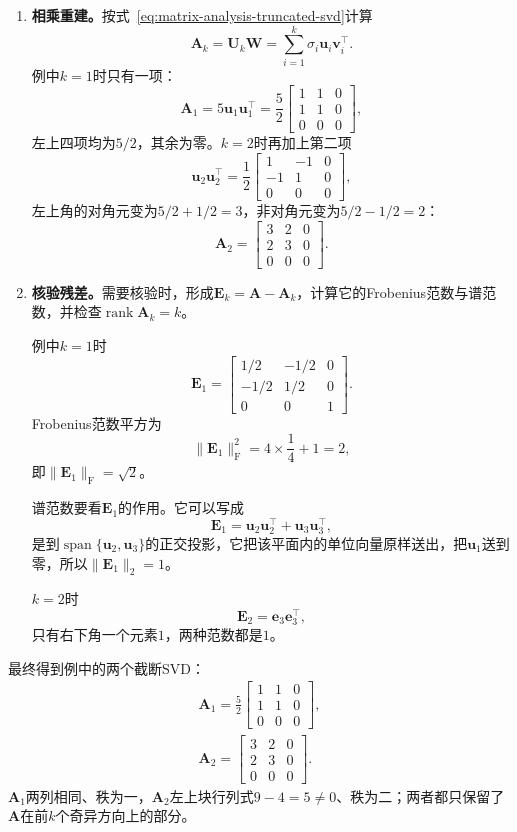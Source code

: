 \begin{enumerate}
 \item \textbf{相乘重建。}按式~\eqref{eq:matrix-analysis-truncated-svd}计算
 \[
  \bm A_k=\bm U_k\bm W=\sum_{i=1}^k\sigma_i\bm u_i\bm v_i^\top .
 \]
 例中$k=1$时只有一项：
 \[
  \bm A_1=5\bm u_1\bm u_1^\top=\frac52\begin{bmatrix}1&1&0\\1&1&0\\0&0&0\end{bmatrix},
 \]
 左上四项均为$5/2$，其余为零。$k=2$时再加上第二项
 \[
  \bm u_2\bm u_2^\top=\frac12\begin{bmatrix}1&-1&0\\-1&1&0\\0&0&0\end{bmatrix},
 \]
 左上角的对角元变为$5/2+1/2=3$，非对角元变为$5/2-1/2=2$：
 \[
  \bm A_2=\begin{bmatrix}3&2&0\\2&3&0\\0&0&0\end{bmatrix}.
 \]

 \item \textbf{核验残差。}需要核验时，形成$\bm E_k=\bm A-\bm A_k$，计算它的Frobenius范数与谱范数，并检查$\operatorname{rank}\bm A_k=k$。

 例中$k=1$时
 \[
  \bm E_1=\begin{bmatrix}1/2&-1/2&0\\-1/2&1/2&0\\0&0&1\end{bmatrix}.
 \]
 Frobenius范数平方为
 \[
  \lVert\bm E_1\rVert_{\mathrm F}^2=4\times\frac14+1=2 ,
 \]
 即$\lVert\bm E_1\rVert_{\mathrm F}=\sqrt2$。

 谱范数要看$\bm E_1$的作用。它可以写成
 \[
  \bm E_1=\bm u_2\bm u_2^\top+\bm u_3\bm u_3^\top ,
 \]
 是到$\operatorname{span}\{\bm u_2,\bm u_3\}$的正交投影，它把该平面内的单位向量原样送出，把$\bm u_1$送到零，所以$\lVert\bm E_1\rVert_2=1$。

 $k=2$时
 \[
  \bm E_2=\bm e_3\bm e_3^\top ,
 \]
 只有右下角一个元素$1$，两种范数都是$1$。
\end{enumerate}

最终得到例中的两个截断SVD：
\[
 \begin{gathered}
 \bm A_1=\frac52\begin{bmatrix}1&1&0\\1&1&0\\0&0&0\end{bmatrix},\\
 \bm A_2=\begin{bmatrix}3&2&0\\2&3&0\\0&0&0\end{bmatrix}.
 \end{gathered}
\]
$\bm A_1$两列相同、秩为一，$\bm A_2$左上块行列式$9-4=5\neq0$、秩为二；两者都只保留了$\bm A$在前$k$个奇异方向上的部分。

